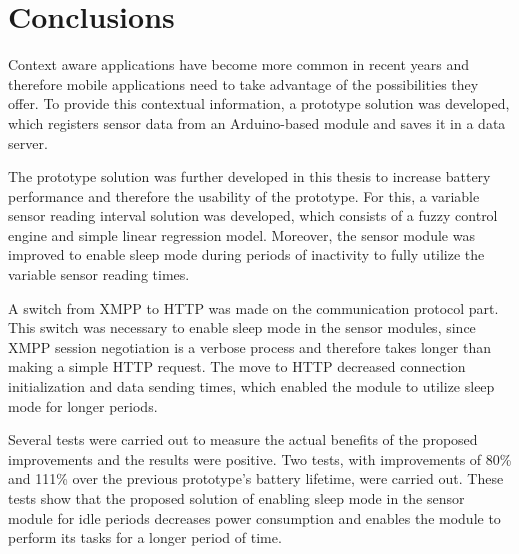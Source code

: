 
\chapter{Conclusions} %

Context aware applications have become more common in recent years and therefore mobile applications need to take advantage of the possibilities they offer. To provide this contextual information, a prototype solution was developed, which registers sensor data from an Arduino-based module and saves it in a data server.

The prototype solution was further developed in this thesis to increase battery performance and therefore the usability of the prototype. For this, a variable sensor reading interval solution was developed, which consists of a fuzzy control engine and simple linear regression model. Moreover, the sensor module was improved to enable sleep mode during periods of inactivity to fully utilize the variable sensor reading times.

A switch from XMPP to HTTP was made on the communication protocol part. This switch was necessary to enable sleep mode in the sensor modules, since XMPP session negotiation is a verbose process and therefore takes longer than making a simple HTTP request. The move to HTTP decreased connection initialization and data sending times, which enabled the module to utilize sleep mode for longer periods.

Several tests were carried out to measure the actual benefits of the proposed improvements and the results were positive. Two tests, with improvements of 80\% and 111\% over the previous prototype's battery lifetime, were carried out. These tests show that the proposed solution of enabling sleep mode in the sensor module for idle periods decreases power consumption and enables the module to perform its tasks for a longer period of time.
 

\ifpdf
    \graphicspath{{X/figures/PNG/}{X/figures/PDF/}{X/figures/}}
\else
    \graphicspath{{X/figures/EPS/}{X/figures/}}
\fi



